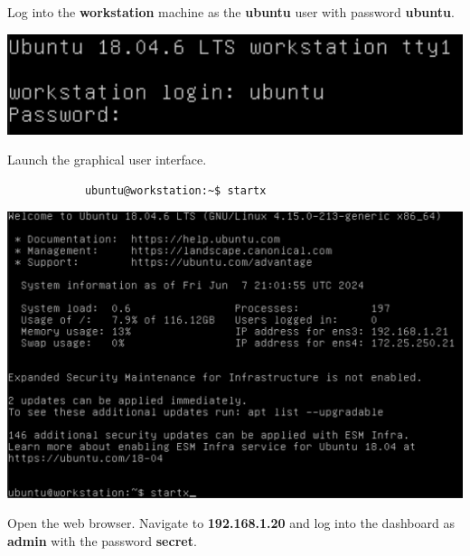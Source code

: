 \documentclass[letterpaper, 12pt]{article}
\begin{document}
\begin{enumerate}
    \begin{labstep}
        Log into the \textbf{workstation} machine as the \textbf{ubuntu} user with password \textbf{ubuntu}.

        \begin{center}
            \includegraphics[width=\linewidth]{images/part1/step1.png}
        \end{center}
    \end{labstep}

    \begin{labstep}
        Launch the graphical user interface.
        \begin{lstlisting}
            ubuntu@workstation:~$ startx
        \end{lstlisting}

        \begin{center}
            \includegraphics[width=\linewidth]{images/part1/step2.png}
        \end{center}
    \end{labstep}

    \begin{labstep}
        Open the web browser.
        Navigate to \textbf{192.168.1.20} and log into the dashboard as \textbf{admin} with the password \textbf{secret}.
    \end{labstep}


\end{enumerate}
\end{document}

